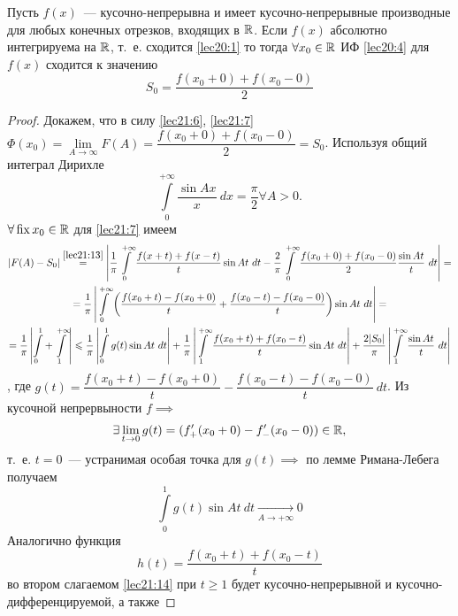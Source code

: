 \documentclass[../../main.tex]{subfiles}
\begin{document}
\begin{thm}[о сходимости ИФ]
	Пусть $ f(x) $~--- кусочно-непрерывна и имеет кусочно-непрерывные
	производные для любых конечных отрезков, входящих в $ \mathbb{R} $.
	Если $ f(x) $ абсолютно интегрируема на $ \mathbb{R} $, т.~е.
	сходится \eqref{lec20:1} то тогда 
	$ \forall x_0 \in \mathbb{R} $ ИФ \eqref{lec20:4} для $ f(x) $ сходится
	к значению 
	\begin{equation}
	\label{lec21:13}
	S_0 = \dfrac{f(x_0 + 0) + f(x_0 - 0)}{2}
	\end{equation}
\end{thm}
\begin{proof}
	Докажем, что в силу \eqref{lec21:6}, \eqref{lec21:7}
	$ \Phi(x_0) = \lim\limits_{A \to \infty} F(A) = 
	\dfrac{f(x_0 + 0) + f(x_0 - 0)}{2} = S_0 $.
	Используя общий интеграл Дирихле 
	\[
	\int\limits_{0}^{+\infty} \dfrac{\sin Ax}{x}\ dx = 
	\dfrac{\pi}{2} \forall A > 0.
	\]
	$ \forall \operatorname{fix} x_0 \in \mathbb{R} $ для \eqref{lec21:7} имеем
	\begin{equation}
	\label{lec21:14}
	\begin{gathered}
	|F(A) - S_0| \stackrel{\eqref{lec21:13}}{=}
	\left|
	\dfrac{1}{\pi}
	\int\limits_{0}^{+\infty}
	\dfrac{f(x + t) + f(x - t)}{t} \sin At\ dt - 
	\dfrac{2}{\pi} \int\limits_{0}^{+\infty} 
	\dfrac{f(x_0 + 0) + f(x_0 - 0)}{2} \dfrac{\sin At}{t}\ dt
	\right| = \\ =
	\dfrac{1}{\pi} \left|
	\int\limits_{0}^{+\infty} \left(
	\dfrac{f(x_0 + t) - f(x_0 + 0)}{t} +
	\dfrac{f(x_0 - t) - f(x_0 - 0) }{t}
	\right)
	\sin At\ dt
	\right| = \\ = \dfrac{1}{\pi}
	\left|
	\int\limits_{0}^{1} + \int\limits_{1}^{+\infty}
	\right| \leqslant \dfrac{1}{\pi}
	\left|
	\int\limits_{0}^{1} g(t) \sin At\ dt
	\right| + \dfrac{1}{\pi}
	\left|
	\int\limits_{1}^{+\infty} 
	\dfrac{f(x_0 + t) + f(x_0 - t)}{t} \sin At\ dt
	\right| + \dfrac{2|S_0|}{\pi}
	\left|
	\int\limits_{1}^{+\infty} \dfrac{\sin At}{t}\ dt
	\right|
	\end{gathered}
	\end{equation}, где $ g(t) = \dfrac{f(x_0 + t) - f(x_0 + 0)}{t} - 
	\dfrac{f(x_0 - t) - f(x_0 - 0)}{t}\ dt $.
	Из кусочной непрервыности $ f \implies $
	\[
	\exists \lim\limits_{t \to 0} g(t) =
	(f_+'(x_0 + 0) - f_-'(x_0 - 0)) \in \mathbb{R},
	\] т.~е. $ t = 0 $~--- устранимая особая точка для $ g(t) \implies $
	по лемме Римана-Лебега получаем
	\[
	\int\limits_{0}^{1} g(t) \sin At\ dt
	\underset{A \to +\infty}{\to} 0
	\]
	Аналогично функция \[
	h(t) = \dfrac{f(x_0 + t) + f(x_0 - t)}{t}
	\] во втором слагаемом \eqref{lec21:14} при 
	$ t \geq 1 $ будет кусочно-непрерывной и кусочно-дифференцируемой, а также

\end{proof}
\end{document}
